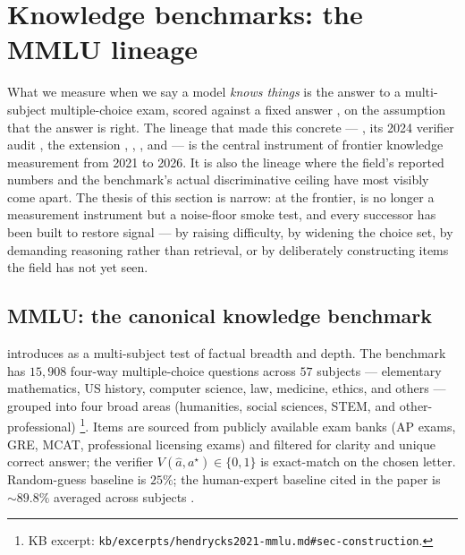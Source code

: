 
\section{Knowledge benchmarks: the MMLU lineage}
\label{sec:knowledge-benchmarks}

What we measure when we say a model \emph{knows things} is the answer
to a multi-subject multiple-choice exam, scored against a fixed answer
, on the assumption that the answer  is right. The lineage that
made this concrete ---  \citep{hendrycks2021-mmlu}, its 2024
verifier audit \citep{mmlu-redux-2024}, the  extension
\citep{wang2024-mmlu-pro},  \citep{rein2023-gpqa},
 \citep{glazer2024-frontiermath}, and 
\citep{phan2025-hle} --- is the central instrument of frontier
knowledge measurement from 2021 to 2026. It is also the lineage where
the field's reported numbers and the benchmark's actual discriminative
ceiling have most visibly come apart. The thesis of this section is
narrow: at the frontier,  is no longer a measurement instrument
but a noise-floor smoke test, and every successor has been built to
restore signal --- by raising difficulty, by widening the choice set,
by demanding reasoning rather than retrieval, or by deliberately
constructing items the field has not yet seen.

\subsection{MMLU: the canonical knowledge benchmark}
\label{sec:knowledge-mmlu}

\citet{hendrycks2021-mmlu} introduces  as a multi-subject test of
factual breadth and depth. The benchmark has $15{,}908$ four-way
multiple-choice questions across $57$ subjects --- elementary
mathematics, US history, computer science, law, medicine, ethics, and
others --- grouped into four broad areas (humanities, social sciences,
STEM, and other-professional)%
\footnote{KB excerpt: \nolinkurl{kb/excerpts/hendrycks2021-mmlu.md#sec-construction}.}.
Items are sourced from publicly available exam banks (AP exams, GRE,
MCAT, professional licensing exams) and filtered for clarity and
unique correct answer; the verifier $V(\hat{a}, a^\star) \in \{0, 1\}$
is exact-match on the chosen letter. Random-guess baseline is $25\%$;
the human-expert baseline cited in the paper is $\sim 89.8\%$
averaged across subjects \citep[\S{}abstract]{hendrycks2021-mmlu}.

